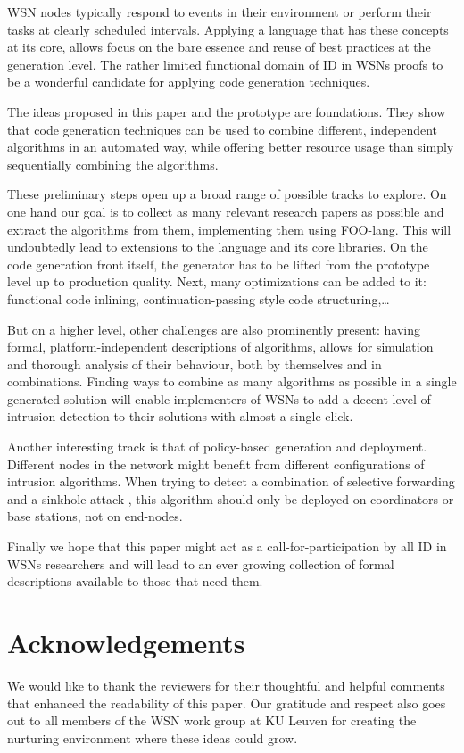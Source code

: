 \documentclass[conference]{IEEEtran}
\begin{document}
WSN nodes typically respond to events in their environment or perform their
tasks at clearly scheduled intervals. Applying a language that has these
concepts at its core, allows focus on the bare essence and reuse of best
practices at the generation level. The rather limited functional domain of ID
in WSNs proofs to be a wonderful candidate for applying code generation
techniques.

The ideas proposed in this paper and the prototype are foundations. They show
that code generation techniques can be used to combine different, independent
algorithms in an automated way, while offering better resource usage than
simply sequentially combining the algorithms.

These preliminary steps open up a broad range of possible tracks to explore. On
one hand our goal is to collect as many relevant research papers as possible
and extract the algorithms from them, implementing them using FOO-lang. This
will undoubtedly lead to extensions to the language and its core libraries. On
the code generation front itself, the generator has to be lifted from the
prototype level up to production quality. Next, many optimizations can be added
to it: functional code inlining, continuation-passing style code
structuring,\dots

But on a higher level, other challenges are also prominently present: having
formal, platform-independent descriptions of algorithms, allows for simulation
and thorough analysis of their behaviour, both by themselves and in
combinations. Finding ways to combine as many algorithms as possible in a
single generated solution will enable implementers of WSNs to add a decent
level of intrusion detection to their solutions with almost a single click.

Another interesting track is that of policy-based generation and deployment.
Different nodes in the network might benefit from different configurations of
intrusion algorithms. When trying to detect a combination of selective
forwarding and a sinkhole attack \cite{ngai2006intruder}, this algorithm should
only be deployed on coordinators or base stations, not on end-nodes.

Finally we hope that this paper might act as a call-for-participation by all
ID in WSNs researchers and will lead to an ever growing collection of formal
descriptions available to those that need them.

\section*{Acknowledgements}
\label{section:acknowledgements}

We would like to thank the reviewers for their thoughtful and helpful comments
that enhanced the readability of this paper. Our gratitude and respect also
goes out to all members of the WSN work group at KU Leuven for creating the
nurturing environment where these ideas could grow.



\end{document}
